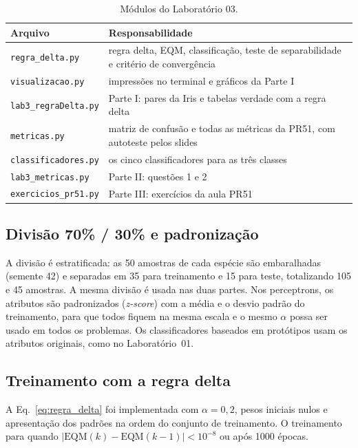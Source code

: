 \documentclass[12pt,a4paper]{article}
\begin{document}
\begin{table}[H]
\centering
\caption{Módulos do Laboratório 03.}
\label{tab:modulos}
\begin{tabular}{lp{10.5cm}}
\toprule
Arquivo & Responsabilidade \\
\midrule
\texttt{regra\_delta.py}       & regra delta, EQM, classificação, teste de separabilidade e critério de convergência \\
\texttt{visualizacao.py}       & impressões no terminal e gráficos da Parte I \\
\texttt{lab3\_regraDelta.py}   & Parte I: pares da Iris e tabelas verdade com a regra delta \\
\texttt{metricas.py}           & matriz de confusão e todas as métricas da PR51, com autoteste pelos slides \\
\texttt{classificadores.py}    & os cinco classificadores para as três classes \\
\texttt{lab3\_metricas.py}     & Parte II: questões 1 e 2 \\
\texttt{exercicios\_pr51.py}   & Parte III: exercícios da aula PR51 \\
\bottomrule
\end{tabular}
\end{table}

\subsection{Divisão 70\% / 30\% e padronização}

A divisão é estratificada: as 50 amostras de cada espécie são embaralhadas (semente 42) e separadas em 35 para treinamento e 15 para teste, totalizando 105 e 45 amostras. A mesma divisão é usada nas duas partes. Nos perceptrons, os atributos são padronizados (\emph{z-score}) com a média e o desvio padrão do treinamento, para que todos fiquem na mesma escala e o mesmo $\alpha$ possa ser usado em todos os problemas. Os classificadores baseados em protótipos usam os atributos originais, como no Laboratório~01.

\subsection{Treinamento com a regra delta}

A Eq.~\eqref{eq:regra_delta} foi implementada com $\alpha = 0{,}2$, pesos iniciais nulos e apresentação dos padrões na ordem do conjunto de treinamento. O treinamento para quando $|\text{EQM}(k) - \text{EQM}(k-1)| < 10^{-8}$ ou após 1000 épocas.
\end{document}
